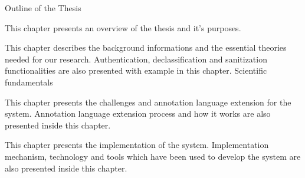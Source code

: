 \clearemptydoublepage

{}

\begin{center}
	\huge{Outline of the Thesis}
\end{center}



  \vspace{1mm}

\noindent  This chapter presents an overview of the thesis and it's purposes. 

  \vspace{1mm}

\noindent  This chapter describes the background informations and the essential theories needed for our research. Authentication, declassification and sanitization functionalities are also presented with example in this chapter. Scientific fundamentals 


  \vspace{1mm}

\noindent  This chapter presents the challenges and annotation language extension for the system. Annotation language extension process and how it works are also presented inside this chapter.

  \vspace{1mm}

\noindent  This chapter presents the implementation of the system. Implementation mechanism, technology and tools which have been used to develop the system are also presented inside this chapter.

  \vspace{1mm}

